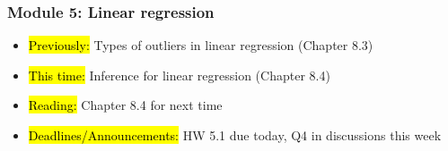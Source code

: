 
\begin{frame}
    \frametitle{Module 5: Linear regression}
    \begin{itemize}
        \item \hl{Previously: }Types of outliers in linear regression (Chapter 8.3)
        \item \hl{This time: }Inference for linear regression (Chapter 8.4)
        \item \hl{Reading: }Chapter 8.4 for next time
        \item \hl{Deadlines/Announcements: }HW 5.1 due today, Q4 in discussions this week
    \end{itemize}
    
\end{frame}
